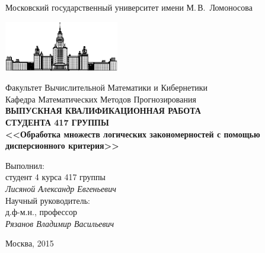 \documentclass[12pt]{article}
\begin{document}
\begin{titlepage}
\begin{center}
    Московский государственный университет имени М.\,В.~Ломоносова

    \bigskip
    \includegraphics[width=50mm]{msu.eps}

    \bigskip
    Факультет Вычислительной Математики и Кибернетики\\
    Кафедра Математических Методов Прогнозирования\\[10mm]

    \textsf{\large\bfseries
        ВЫПУСКНАЯ КВАЛИФИКАЦИОННАЯ РАБОТА \\СТУДЕНТА 417 ГРУППЫ\\[10mm]
        <<Обработка множеств логических закономерностей с помощью
        дисперсионного критерия>>
    }\\[10mm]

    \begin{flushright}
        \parbox{0.5\textwidth}{
            Выполнил:\\
            студент 4 курса 417 группы\\
            \emph{Лисяной Александр Евгеньевич}\\[5mm]
            Научный руководитель:\\
            д.ф-м.н., профессор\\
            \emph{Рязанов Владимир Васильевич}
        }
    \end{flushright}


    \vspace{\fill}
    Москва, 2015
\end{center}
\end{titlepage}
\end{document}

